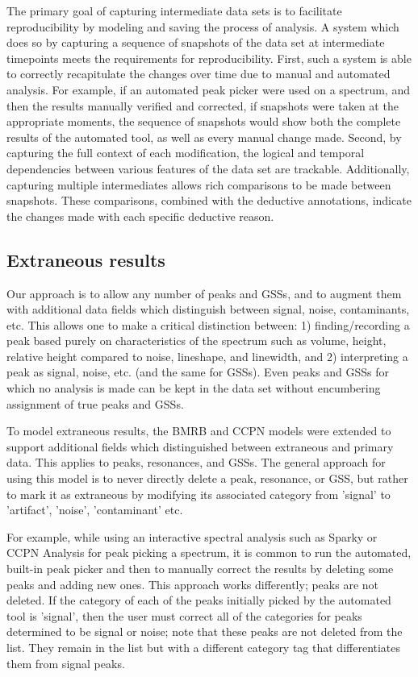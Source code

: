 The primary goal of capturing intermediate data sets is to 
facilitate reproducibility by modeling and saving the process of analysis.  
A system which does so by capturing a sequence of snapshots of the data set 
at intermediate timepoints meets the requirements for reproducibility.
First, such a system is able to correctly recapitulate the changes over time
due to manual and automated analysis.  For example,
if an automated peak picker were used on a spectrum, and then the results
manually verified and corrected, if snapshots were taken at the appropriate
moments, the sequence of snapshots would show both the complete results of
the automated tool, as well as every manual change made.
Second, by capturing the full context of each modification, the logical and 
temporal dependencies between various features of the data set are trackable.
Additionally, capturing multiple intermediates allows rich comparisons to be made 
between snapshots.  These comparisons, combined with the deductive annotations,
indicate the changes made with each specific deductive reason. 


\subsection*{Extraneous results}
Our approach is to allow any number of peaks and GSSs, and to 
augment them with additional data fields which distinguish between signal, 
noise, contaminants, etc.  This allows one to make a critical distinction 
between: 1) finding/recording a peak based purely on characteristics of 
the spectrum such as volume, height, relative height compared to noise, 
lineshape, and linewidth, and 2) interpreting a peak as signal, noise, 
etc. (and the same for GSSs).  Even peaks and GSSs for 
which no analysis is made can be kept in the data set without encumbering 
assignment of true peaks and GSSs.

To model extraneous results, the BMRB and CCPN models \cite{bmrb, ccpn}
were extended to support additional fields which distinguished between 
extraneous and primary data.
This applies to peaks, resonances, and GSSs.
The general approach for using this model is to never directly delete
a peak, resonance, or GSS, but rather to mark it as extraneous by modifying
its associated category from 'signal' to 'artifact', 'noise', 'contaminant'
etc.

For example, while using an interactive spectral analysis such as Sparky or
CCPN Analysis \cite{sparky, ccpn} for peak picking a spectrum, it is common
to run the automated, built-in peak picker and then to manually correct the
results by deleting some peaks and adding new ones.  This approach works
differently; peaks are not deleted.  If the category of each of the
peaks initially picked by the automated tool is 'signal', then the
user must correct all of the categories for peaks 
determined to be signal or noise; note that these peaks are not deleted
from the list.  They remain in the list but with a different category
tag that differentiates them from signal peaks.


